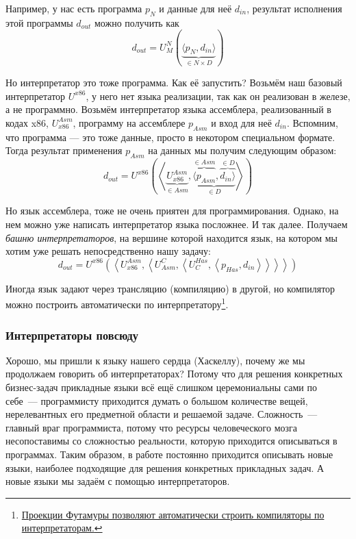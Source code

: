 \documentclass[12pt]{article}
\newcommand{\point}[1]{{\color{blue}\textit{#1}}} %
\begin{document}
    Например, у нас есть программа $p_N$ и данные для неё $d_{in}$, результат исполнения этой программы $d_{out}$ можно получить как \[d_{out} = U_M^N\left( \underbrace{\langle p_N, d_{in} \rangle}_{\in N\times D} \right)\]

    Но интерпретатор это тоже программа.
    Как её запустить?
    Возьмём наш базовый интерпретатор $U^{x86}$, у него нет языка реализации, так как он реализован в железе, а не программно.
    Возьмём интерпретатор языка ассемблера, реализованный в кодах x86, $U_{x86}^{Asm}$, программу на ассемблере $p_{Asm}$ и вход для неё $d_{in}$.
    Вспомним, что программа --- это тоже данные, просто в некотором специальном формате.
    Тогда результат применения $p_{Asm}$ на данных мы получим следующим образом:
    \[
        d_{out} = U^{x86}\left(\left<\underbrace{U_{x86}^{Asm}}_{\in Asm}, \underbrace{\overbrace{\langle p_{Asm}}^{\in Asm}, \overbrace{d_{in} \rangle}^{\in D}}_{\in D} \right>\right)
    \]

    Но язык ассемблера, тоже не очень приятен для программирования.
    Однако, на нем можно уже написать интерпретатор языка посложнее.
    И так далее.
    Получаем \point{башню интерпретаторов}, на вершине которой находится язык, на котором мы хотим уже решать непосредственно нашу задачу:
    \[
        d_{out} =
        U^{x86}\left(\left<
        U_{x86}^{Asm}, \left<
        U^C_{Asm}, \left<
        U^{Has}_C, \left< p_{Has}, d_{in}
        \right>\right>\right>\right>\right)
    \]

    Иногда язык задают через трансляцию (компиляцию) в другой, но компилятор можно построить автоматически по интерпретатору\footnote{\href{https://habr.com/ru/articles/47418/}{Проекции Футамуры позволяют автоматически строить компиляторы по интерпретаторам.}}.

    \subsubsection{Интерпретаторы повсюду}

    Хорошо, мы пришли к языку нашего сердца (Хаскеллу), почему же мы продолжаем говорить об интерпретаторах?
    Потому что для решения конкретных бизнес-задач прикладные языки всё ещё слишком церемониальны сами по себе~--- программисту приходится думать о большом количестве вещей, нерелевантных его предметной области и решаемой задаче.
    Сложность~--- главный враг программиста, потому что ресурсы человеческого мозга несопоставимы со сложностью реальности, которую приходится описываться в программах.
    Таким образом, в работе постоянно приходится описывать новые языки, наиболее подходящие для решения конкретных прикладных задач.
    А новые языки мы задаём с помощью интерпретаторов.
\end{document}
